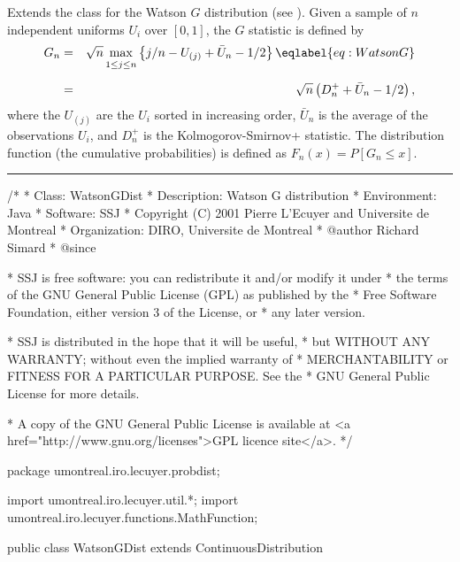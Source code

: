 
Extends the class  for the
Watson $G$  distribution (see \cite{tDAR83a,tWAT76a}).
Given a sample of $n$ independent uniforms $U_i$ over $[0,1]$,
the $G$ statistic is defined by
 \begin {eqnarray}
  G_n &=& \sqrt{n} \max_{\rule{0pt}{7pt} 1\le j \le n} \left\{ j/n -
         U_{(j)} + \bar U_n - 1/2 \right\}  \eqlabel {eq:WatsonG} \\[6pt]
    &=& \sqrt{n}\left (D_n^+ + \bar U_n  - 1/2\right), \nonumber
 \end {eqnarray}
  where the $U_{(j)}$ are the $U_i$ sorted in increasing order,
  $\bar U_n$ is the average of the observations $U_{i}$,
  and $D_n^+$ is the Kolmogorov-Smirnov+ statistic.
  The  distribution function (the cumulative probabilities)
  is defined as $F_n(x) = P[G_n \le x]$.


\bigskip\hrule

\begin{code}
\begin{hide}
/*
 * Class:        WatsonGDist
 * Description:  Watson G distribution
 * Environment:  Java
 * Software:     SSJ 
 * Copyright (C) 2001  Pierre L'Ecuyer and Universite de Montreal
 * Organization: DIRO, Universite de Montreal
 * @author       Richard Simard
 * @since

 * SSJ is free software: you can redistribute it and/or modify it under
 * the terms of the GNU General Public License (GPL) as published by the
 * Free Software Foundation, either version 3 of the License, or
 * any later version.

 * SSJ is distributed in the hope that it will be useful,
 * but WITHOUT ANY WARRANTY; without even the implied warranty of
 * MERCHANTABILITY or FITNESS FOR A PARTICULAR PURPOSE.  See the
 * GNU General Public License for more details.

 * A copy of the GNU General Public License is available at
   <a href="http://www.gnu.org/licenses">GPL licence site</a>.
 */
\end{hide}
package umontreal.iro.lecuyer.probdist;
\begin{hide}
import umontreal.iro.lecuyer.util.*;
import umontreal.iro.lecuyer.functions.MathFunction;
\end{hide} 

public class WatsonGDist extends ContinuousDistribution\begin{hide} {
   protected int n;

   private static class Function implements MathFunction {
      protected int n;
      protected double u;

      public Function (int n, double u) {
         this.n = n;
         this.u = u;
      }

      public double evaluate (double x) {
         return u - cdf(n,x);
      }
   }
\end{hide}
\end{code}
